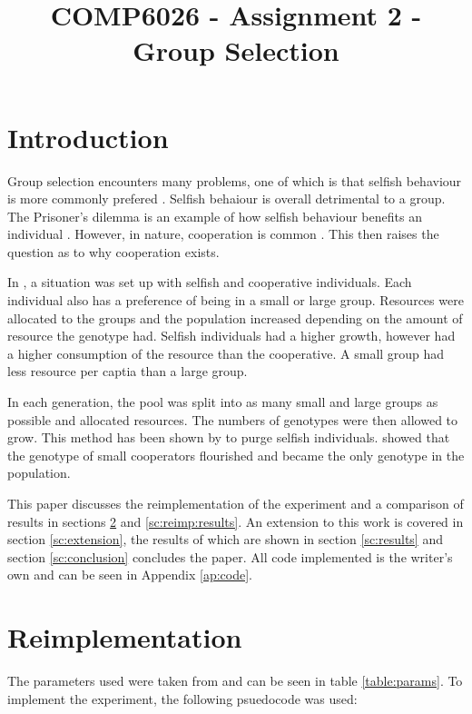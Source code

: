 \documentclass[11pt]{ecsarticle}
\title{COMP6026 - Assignment 2 - Group Selection}
\begin{document}
\maketitle
 
\section{Introduction}

Group selection encounters many problems, one of which is that selfish behaviour is more commonly prefered \citep{powers2012efficacy}.
Selfish behaiour is overall detrimental to a group.
The Prisoner's dilemma is an example of how selfish behaviour benefits an individual \citep{axelrod1987evolution}. 
However, in nature, cooperation is common \citep{szathmary1995major}. 
This then raises the question as to why cooperation exists. 

In \cite{powers2007individual}, a situation was set up with selfish and cooperative individuals.
Each individual also has a preference of being in a small or large group. 
Resources were allocated to the groups and the population increased depending on the amount of resource the genotype had. 
Selfish individuals had a higher growth, however had a higher consumption of the resource than the cooperative.
A small group had less resource per captia than a large group.

In each generation, the pool was split into as many small and large groups as possible and allocated resources.
The numbers of genotypes were then allowed to grow. 
This method has been shown by \cite{wilson1975theory} to purge selfish individuals. 
\cite{powers2007individual} showed that the genotype of small cooperators flourished and became the only genotype in the population. 


This paper discusses the reimplementation of the experiment \cite{powers2007individual} and a comparison of results in sections \ref{sc:reimplementation} and \ref{sc:reimp:results}.
An extension to this work is covered in section \ref{sc:extension}, the results of which are shown in section \ref{sc:results} and section \ref{sc:conclusion} concludes the paper. All code implemented is the writer's own and can be seen in Appendix \ref{ap:code}.


\section{Reimplementation}\label{sc:reimplementation}

The parameters used were taken from \cite{powers2007individual} and can be seen in table \ref{table:params}.
To implement the experiment, the following psuedocode was used:
\end{document}
